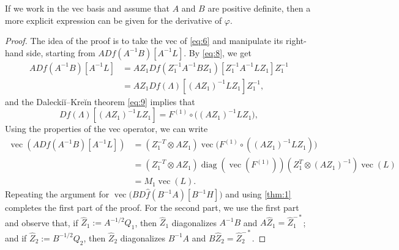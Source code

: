 \documentclass[DIV=14]{scrartcl}
\theoremstyle{thmstyletwo}
\newtheorem{lemma}[theorem]{Lemma}
\theoremstyle{definition}
\numberwithin{equation}{section}
\DeclareMathOperator{\diag}{diag}
\DeclareMathOperator{\opvec}{vec}
\newcommand{\wh}{\widehat}
\newcommand{\deq}{\ensuremath{:=}}
\newcommand{\deqr}{\ensuremath{=:}}
\renewcommand{\Lambda}{\varLambda}
\newcommand{\Df}[3]{D#1(#2)[#3]}
\begin{document}
If we work in the vec basis and assume that $A$ and $B$ are positive definite, then  a more explicit expression can be given for the derivative of $\varphi$.


\begin{proof}
The idea of the proof is to take the vec of \eqref{eq:6} and manipulate its right-hand side, starting from $A\Df{f}{A^{-1}B}{A^{-1}L}$.
By \eqref{eq:8}, we get
\begin{equation}\label{eq:11}
  \begin{aligned}
    A\Df{f}{A^{-1}B}{A^{-1}L}
    &= AZ_1\Df{f}{Z_1^{-1}A^{-1}BZ_1}{Z_1^{-1}A^{-1}LZ_1}Z_1^{-1}\\
    &= AZ_1\Df{f}{\Lambda}{(AZ_1)^{-1}LZ_1}Z_1^{-1},
  \end{aligned}
\end{equation}
and the Daleckiĭ--Kreĭn theorem \eqref{eq:9} implies that
\[
    \Df{f}{\Lambda}{(AZ_1)^{-1}LZ_1}
    = F^{(1)}
    \circ \bigl((AZ_1)^{-1}LZ_1\bigr),
\]
Using the properties of the vec operator, we can write
\begin{equation}\label{eq:12}
\begin{split}
\opvec(A\Df{f}{A^{-1}B}{A^{-1}L})
& = (Z_1^{-T}\otimes AZ_1)\opvec\bigl(F^{(1)}\circ((AZ_1)^{-1}LZ_1)\bigr)\\
& = (Z_1^{-T}\otimes AZ_1)\diag(\opvec(F^{(1)}))(Z_1^T\otimes (AZ_1)^{-1})\opvec(L)\\
&  = M_1 \opvec(L).
\end{split}
\end{equation}
Repeating the argument for $\opvec\bigl(B\Df{\widehat f}{B^{-1}A}{B^{-1}H}\bigr)$ and using \cref{thm:1} completes the first part of the proof.
For the second part, we use the first part and observe that, if $\wh Z_1\deq{}A^{-1/2}Q_1$, then $\wh Z_1$ diagonalizes $A^{-1}B$ and $A\wh Z_1=\wh Z_1^{-*}$; and if $\wh Z_2\deq{}B^{-1/2}Q_2$, then $\wh Z_2$ diagonalizes $B^{-1}A$ and $B\wh Z_2=\wh Z_2^{-*}$.
\end{proof}
\end{document}
